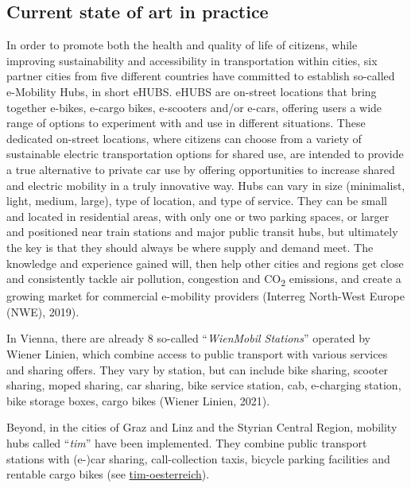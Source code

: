 \documentclass[
]{book}
\begin{document}
\hypertarget{current-state-of-art-in-practice-20}{%
\subsection*{Current state of art in practice}\label{current-state-of-art-in-practice-20}}

In order to promote both the health and quality of life of citizens, while improving sustainability and accessibility in transportation within cities, six partner cities from five different countries have committed to establish so-called e-Mobility Hubs, in short eHUBS. eHUBS are on-street locations that bring together e-bikes, e-cargo bikes, e-scooters and/or e-cars, offering users a wide range of options to experiment with and use in different situations. These dedicated on-street locations, where citizens can choose from a variety of sustainable electric transportation options for shared use, are intended to provide a true alternative to private car use by offering opportunities to increase shared and electric mobility in a truly innovative way. Hubs can vary in size (minimalist, light, medium, large), type of location, and type of service. They can be small and located in residential areas, with only one or two parking spaces, or larger and positioned near train stations and major public transit hubs, but ultimately the key is that they should always be where supply and demand meet. The knowledge and experience gained will, then help other cities and regions get close and consistently tackle air pollution, congestion and CO\textsubscript{2} emissions, and create a growing market for commercial e-mobility providers (Interreg North-West Europe (NWE), 2019).

In Vienna, there are already 8 so-called ``\emph{WienMobil Stations}'' operated by Wiener Linien, which combine access to public transport with various services and sharing offers. They vary by station, but can include bike sharing, scooter sharing, moped sharing, car sharing, bike service station, cab, e-charging station, bike storage boxes, cargo bikes (Wiener Linien, 2021).

Beyond, in the cities of Graz and Linz and the Styrian Central Region, mobility hubs called ``\emph{tim}'' have been implemented. They combine public transport stations with (e-)car sharing, call-collection taxis, bicycle parking facilities and rentable cargo bikes (see \href{https://www.tim-oesterreich.at}{tim-oesterreich}).
\end{document}
